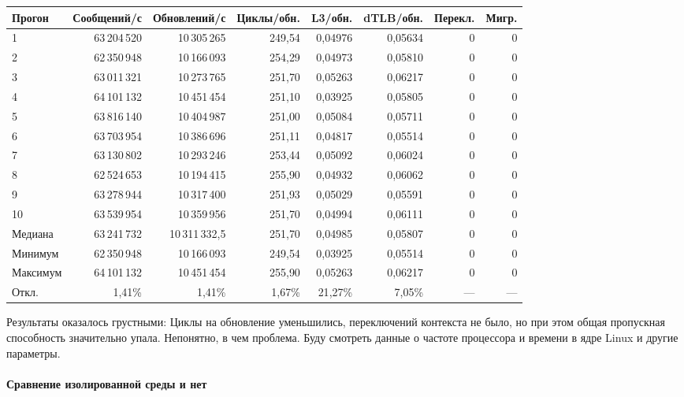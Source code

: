 \documentclass[a4paper,12pt]{article}
\begin{document}
\begin{center}
\small
\setlength{\tabcolsep}{2.5pt}
\begin{tabular}{lrrrrrrr}
\toprule
Прогон & Сообщений/с & Обновлений/с & Циклы/обн. & L3/обн. &
dTLB/обн. & Перекл. & Мигр. \\
\midrule
1 & 63\,204\,520 & 10\,305\,265 & 249{,}54 & 0{,}04976 & 0{,}05634 & 0 & 0 \\
2 & 62\,350\,948 & 10\,166\,093 & 254{,}29 & 0{,}04973 & 0{,}05810 & 0 & 0 \\
3 & 63\,011\,321 & 10\,273\,765 & 251{,}70 & 0{,}05263 & 0{,}06217 & 0 & 0 \\
4 & 64\,101\,132 & 10\,451\,454 & 251{,}10 & 0{,}03925 & 0{,}05805 & 0 & 0 \\
5 & 63\,816\,140 & 10\,404\,987 & 251{,}00 & 0{,}05084 & 0{,}05711 & 0 & 0 \\
6 & 63\,703\,954 & 10\,386\,696 & 251{,}11 & 0{,}04817 & 0{,}05514 & 0 & 0 \\
7 & 63\,130\,802 & 10\,293\,246 & 253{,}44 & 0{,}05092 & 0{,}06024 & 0 & 0 \\
8 & 62\,524\,653 & 10\,194\,415 & 255{,}90 & 0{,}04932 & 0{,}06062 & 0 & 0 \\
9 & 63\,278\,944 & 10\,317\,400 & 251{,}93 & 0{,}05029 & 0{,}05591 & 0 & 0 \\
10 & 63\,539\,954 & 10\,359\,956 & 251{,}70 & 0{,}04994 & 0{,}06111 & 0 & 0 \\
\midrule
Медиана & 63\,241\,732 & 10\,311\,332{,}5 & 251{,}70 & 0{,}04985 & 0{,}05807 & 0 & 0 \\
Минимум & 62\,350\,948 & 10\,166\,093 & 249{,}54 & 0{,}03925 & 0{,}05514 & 0 & 0 \\
Максимум & 64\,101\,132 & 10\,451\,454 & 255{,}90 & 0{,}05263 & 0{,}06217 & 0 & 0 \\
Откл. & 1{,}41\% & 1{,}41\% & 1{,}67\% & 21{,}27\% & 7{,}05\% & --- & --- \\
\bottomrule
\end{tabular}
\end{center}

Результаты оказалось грустными: Циклы на обновление уменьшились, переключений
контекста не было, но при этом общая пропускная способность значительно упала.
Непонятно, в чем проблема. Буду смотреть данные о частоте процессора и времени в
ядре Linux и другие параметры. 

\paragraph{Сравнение изолированной среды и нет}
\end{document}
